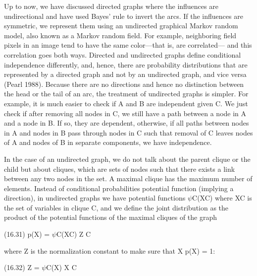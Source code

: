 Up to now, we have discussed directed graphs where the influences are undirectional and have used Bayes’ rule to invert the arcs. If the influences are symmetric, we represent them using an undirected graphical Markov random model, also known as a Markov random field. For example, neighboring field pixels in an image tend to have the same color---that is, are correlated--- and this correlation goes both ways. Directed and undirected graphs define conditional independence differently, and, hence, there are probability distributions that are represented by a directed graph and not by an undirected graph, and vice versa (Pearl 1988). Because there are no directions and hence no distinction between the head or the tail of an arc, the treatment of undirected graphs is simpler. For example, it is much easier to check if A and B are independent given C. We just check if after removing all nodes in C, we still have a path between a node in A and a node in B. If so, they are dependent, otherwise, if all paths between nodes in A and nodes in B pass through nodes in C such that removal of C leaves nodes of A and nodes of B in separate components, we have independence.

In the case of an undirected graph, we do not talk about the parent clique or the child but about cliques, which are sets of nodes such that there exists a link between any two nodes in the set. A maximal clique has the maximum number of elements. Instead of conditional probabilities potential function (implying a direction), in undirected graphs we have potential functions $\psi$C(XC) where XC is the set of variables in clique C, and we define the joint distribution as the product of the potential functions of the maximal cliques of the graph

(16.31) p(X) = $\psi$C(XC) Z C

where Z is the normalization constant to make sure that X p(X) = 1:

(16.32) Z = $\psi$C(X) X C

